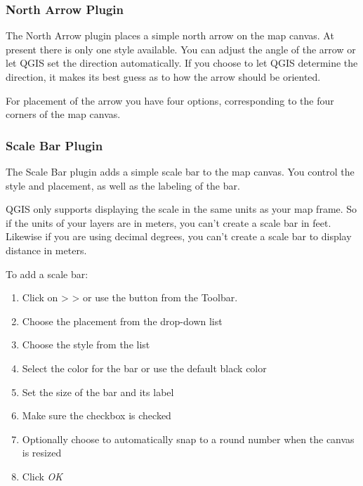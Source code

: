 \subsubsection{North Arrow Plugin}

The North Arrow plugin places a simple north arrow on the map canvas. At
present there is only one style available. You can adjust the angle of the
arrow or let QGIS set the direction automatically. If you choose to let
QGIS determine the direction, it makes its best guess as to how the arrow
should be oriented.

For placement of the arrow you have four options, corresponding to the four 
corners of the map canvas.


\subsubsection{Scale Bar Plugin}
The Scale Bar plugin adds a simple scale bar to the map canvas. You
control the style and placement, as well as the labeling of the bar. 

QGIS only supports displaying the scale in the same units as your map frame. So
if the units of your layers are in meters, you can't create a scale bar in
feet. Likewise if you are using decimal degrees, you can't create a scale
bar to display distance in meters.

To add a scale bar:

\begin{enumerate}
\item Click on  >  >  or use the  button from the Toolbar.
\item Choose the placement from the  drop-down list
\item Choose the style from the  list
\item Select the color for the bar  or use the default black color
\item Set the size of the bar and its label 
\item Make sure the  checkbox is checked
\item Optionally choose to automatically snap to a round number when the
  canvas is resized 
\item Click \textsl{OK} 
\end{enumerate} 

